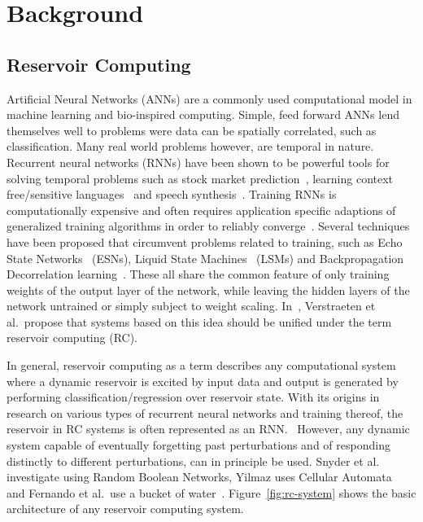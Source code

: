 \section{Background}
\label{sec:background}

\subsection{Reservoir Computing}

Artificial Neural Networks (ANNs) are a commonly used computational model in machine learning and bio-inspired computing.
Simple, feed forward ANNs lend themselves well to problems were data can be spatially correlated, such as classification.
Many real world problems however, are temporal in nature.
Recurrent neural networks (RNNs) have been shown to be powerful tools for solving temporal problems such as stock market prediction~\cite{Lawrence2001}, learning context free/sensitive languages~\cite{Gers2001} and speech synthesis~\cite{Wu2016}.
Training RNNs is computationally expensive and often requires application specific adaptions of generalized training algorithms in order to reliably converge~\cite{Hammer2002}.
Several techniques have been proposed that circumvent problems related to training, such as Echo State Networks~\cite{Jaeger2001} (ESNs), Liquid State Machines~\cite{Maass2002} (LSMs) and Backpropagation Decorrelation learning~\cite{Steil2004}.
These all share the common feature of only training weights of the output layer of the network, while leaving the hidden layers of the network untrained or simply subject to weight scaling.
In~\cite{Verstraeten2007}, Verstraeten et al.\ propose that systems based on this idea should be unified under the term reservoir computing (RC).

In general, reservoir computing as a term describes any computational system where a dynamic reservoir is excited by input data and output is generated by performing classification/regression over reservoir state.
With its origins in research on various types of recurrent neural networks and training thereof, the reservoir in RC systems is often represented as an RNN.~\cite{Verstraeten2007}
However, any dynamic system capable of eventually forgetting past perturbations and of responding distinctly to different perturbations, can in principle be used.
Snyder et al.~\cite{Snyder2013} investigate using Random Boolean Networks, Yilmaz uses Cellular Automata~\cite{Yilmaz2014} and Fernando et al.\ use a bucket of water~\cite{Fernando2003}.
Figure~\ref{fig:rc-system} shows the basic architecture of any reservoir computing system.


